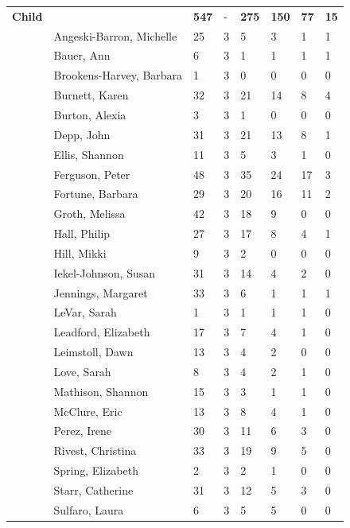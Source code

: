\documentclass{article}\usepackage[]{graphicx}\usepackage[]{color}
\begin{document}
{\begin{longtable} { >{\raggedright}p{}p{}p{}p{}p{}p{}p{}p{}}
   \hline
\textbf{Child} &  & \textbf{547} & - & \textbf{275} & \textbf{150} & \textbf{77} & \textbf{15} \\ 
   \rowcolor[gray]{0.90} & Angeski-Barron, Michelle & 25 & 3 & 5 & 3 & 1 & 1 \\ 
   & Bauer, Ann & 6 & 3 & 1 & 1 & 1 & 1 \\ 
   & Brookens-Harvey, Barbara & 1 & 3 & 0 & 0 & 0 & 0 \\ 
   & Burnett, Karen & 32 & 3 & 21 & 14 & 8 & 4 \\ 
   \rowcolor[gray]{0.90} & Burton, Alexia & 3 & 3 & 1 & 0 & 0 & 0 \\ 
   \rowcolor[gray]{0.90} & Depp, John & 31 & 3 & 21 & 13 & 8 & 1 \\ 
   \rowcolor[gray]{0.90} & Ellis, Shannon & 11 & 3 & 5 & 3 & 1 & 0 \\ 
   & Ferguson, Peter & 48 & 3 & 35 & 24 & 17 & 3 \\ 
   & Fortune, Barbara & 29 & 3 & 20 & 16 & 11 & 2 \\ 
   & Groth, Melissa & 42 & 3 & 18 & 9 & 0 & 0 \\ 
   \rowcolor[gray]{0.90} & Hall, Philip & 27 & 3 & 17 & 8 & 4 & 1 \\ 
   \rowcolor[gray]{0.90} & Hill, Mikki & 9 & 3 & 2 & 0 & 0 & 0 \\ 
   \rowcolor[gray]{0.90} & Iekel-Johnson, Susan & 31 & 3 & 14 & 4 & 2 & 0 \\ 
   & Jennings, Margaret & 33 & 3 & 6 & 1 & 1 & 1 \\ 
   & LeVar, Sarah & 1 & 3 & 1 & 1 & 1 & 0 \\ 
   & Leadford, Elizabeth & 17 & 3 & 7 & 4 & 1 & 0 \\ 
   \rowcolor[gray]{0.90} & Leimstoll, Dawn & 13 & 3 & 4 & 2 & 0 & 0 \\ 
   \rowcolor[gray]{0.90} & Love, Sarah & 8 & 3 & 4 & 2 & 1 & 0 \\ 
   \rowcolor[gray]{0.90} & Mathison, Shannon & 15 & 3 & 3 & 1 & 1 & 0 \\ 
   & McClure, Eric & 13 & 3 & 8 & 4 & 1 & 0 \\ 
   & Perez, Irene & 30 & 3 & 11 & 6 & 3 & 0 \\ 
   & Rivest, Christina & 33 & 3 & 19 & 9 & 5 & 0 \\ 
   \rowcolor[gray]{0.90} & Spring, Elizabeth & 2 & 3 & 2 & 1 & 0 & 0 \\ 
   \rowcolor[gray]{0.90} & Starr, Catherine & 31 & 3 & 12 & 5 & 3 & 0 \\ 
   \rowcolor[gray]{0.90} & Sulfaro, Laura & 6 & 3 & 5 & 5 & 0 & 0 \\ 

\end{longtable}}
\end{document}
